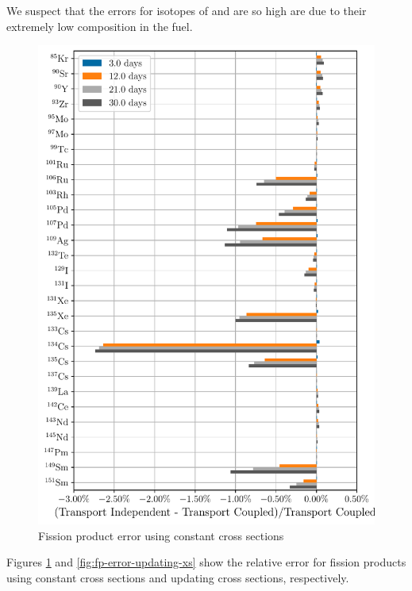     We suspect that the errors for isotopes of  and  are so high
    are due to their extremely low composition in the fuel.



    \begin{figure}[h!tpb]
        \centering
        \includegraphics[width=\linewidth]{figs/fission_products_constant_xs_predictor_fission_q_days.pdf}
        \caption{Fission product error using constant cross sections}
        \label{fig:fp-error-constant-xs}
    \end{figure}

    Figures \ref{fig:fp-error-constant-xs} and \ref{fig:fp-error-updating-xs}
    show the relative error for fission products using constant cross sections
    and updating cross sections, respectively.

